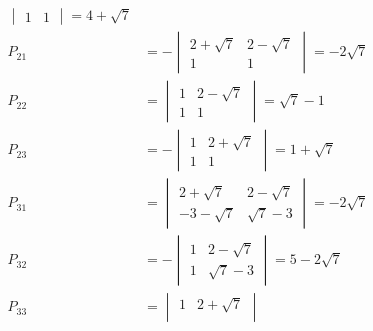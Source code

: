 \documentclass[letterpaper, 11pt]{article}
\newcommand{\1}{\mathds{1}}	%
\theoremstyle{definition}
\begin{document}
\begin{align*}
\begin{vmatrix}
                1 & 1
              \end{vmatrix} = 4+\sqrt{7}                                                                                                                                            \\
  P_{21}  & = - \begin{vmatrix}
                  2+\sqrt{7} & 2-\sqrt{7} \\
                  1          & 1
                \end{vmatrix} = -2 \sqrt{7}                                                                                                                                         \\
  P_{22}  & = \begin{vmatrix}
                1 & 2-\sqrt{7} \\
                1 & 1
              \end{vmatrix} = \sqrt{7} - 1                                                                                                                                          \\
  P_{23}  & = -\begin{vmatrix}
                 1 & 2+\sqrt{7} \\
                 1 & 1
               \end{vmatrix} = 1 + \sqrt{7}                                                                                                                                         \\
  P_{31}  & = \begin{vmatrix}
                2+\sqrt{7}  & 2-\sqrt{7} \\
                -3-\sqrt{7} & \sqrt{7}-3
              \end{vmatrix} = -2 \sqrt{7}                                                                                                                                           \\
  P_{32}  & = -\begin{vmatrix}
                 1 & 2-\sqrt{7} \\
                 1 & \sqrt{7}-3
               \end{vmatrix} = 5-2 \sqrt{7}                                                                                                                                         \\
  P_{33}  & = \begin{vmatrix}
                1 & 2+\sqrt{7}  \\

\end{vmatrix}
\end{align*}
\end{document}
